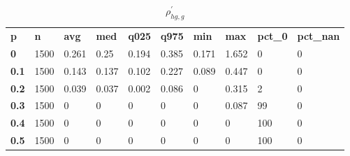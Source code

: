 \begin{table}[h]
 \centering 
\footnotesize
\caption{$\rho_{hg,g}^\prime $}
\label{tab:alphahgg}
\begin{tabular}[h]{| l l l l l l l l l l|
    } \hline
\textbf{ p} & \textbf{ n} & \textbf{ avg} & \textbf{ med} & \textbf{ q025} & \textbf{ q975} & \textbf{ min} & \textbf{ max} & \textbf{ pct\_0} & \textbf{ pct\_nan}
           \\
  \textbf{  0} & 1500 & 0.261 &  0.25 & 0.194 & 0.385 & 0.171 & 1.652 &   0 & 0
           \\
  \textbf{0.1} & 1500 & 0.143 & 0.137 & 0.102 & 0.227 & 0.089 & 0.447 &   0 & 0
           \\
  \textbf{0.2} & 1500 & 0.039 & 0.037 & 0.002 & 0.086 &     0 & 0.315 &   2 & 0
           \\
  \textbf{0.3} & 1500 &     0 &     0 &     0 &     0 &     0 & 0.087 &  99 & 0
           \\
  \textbf{0.4} & 1500 &     0 &     0 &     0 &     0 &     0 &     0 & 100 & 0
           \\
  \textbf{0.5} & 1500 &     0 &     0 &     0 &     0 &     0 &     0 & 100 & 0
           \\
 \hline \end{tabular}
 \end{table}
